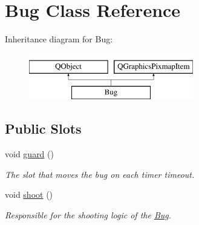 \hypertarget{classBug}{\section{Bug Class Reference}
\label{classBug}
}
Inheritance diagram for Bug\-:\begin{figure}[H]
\begin{center}
\leavevmode
\includegraphics[height=2.000000cm]{classBug}
\end{center}
\end{figure}
\subsection*{Public Slots}
\begin{DoxyCompactItemize}
\item 
\hypertarget{classBug_ad968d4bb17f160ad412da3fa15d5417e}{void \hyperlink{classBug_ad968d4bb17f160ad412da3fa15d5417e}{guard} ()}\label{classBug_ad968d4bb17f160ad412da3fa15d5417e}

\begin{DoxyCompactList}\small\item\em The slot that moves the bug on each timer timeout. \end{DoxyCompactList}\item 
\hypertarget{classBug_ab1d53f066f74c84663c47028c1fdbe77}{void \hyperlink{classBug_ab1d53f066f74c84663c47028c1fdbe77}{shoot} ()}\label{classBug_ab1d53f066f74c84663c47028c1fdbe77}

\begin{DoxyCompactList}\small\item\em Responsible for the shooting logic of the \hyperlink{classBug}{Bug}. \end{DoxyCompactList}\end{DoxyCompactItemize}
